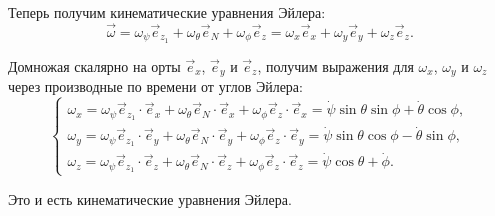 Теперь получим кинематические уравнения Эйлера:
\[
    \vec{\omega} = \omega_\psi\vec{e}_{z_1} + \omega_\theta\vec{e}_N +
    \omega_\phi\vec{e}_z = \omega_x\vec{e}_x + \omega_y\vec{e}_y +
    \omega_z\vec{e}_z.
\]

Домножая скалярно на орты \( \vec{e}_x \), \( \vec{e}_y \) и \( \vec{e}_z \),
получим выражения для \( \omega_x \), \( \omega_y \) и \( \omega_z \) через
производные по времени от углов Эйлера:
\[
    \left\{ \begin{array}{l}
        \omega_x = \omega_\psi\vec{e}_{z_1}\cdot\vec{e}_x +
        \omega_\theta\vec{e}_N\cdot\vec{e}_x +\omega_\phi\vec{e}_z\cdot\vec{e}_x
        = \dot{\psi}\sin\theta\sin\phi + \dot{\theta}\cos\phi, \\
        \omega_y = \omega_\psi\vec{e}_{z_1}\cdot\vec{e}_y +
        \omega_\theta\vec{e}_N\cdot\vec{e}_y +\omega_\phi\vec{e}_z\cdot\vec{e}_y
        = \dot{\psi}\sin\theta\cos\phi - \dot{\theta}\sin\phi, \\
        \omega_z = \omega_\psi\vec{e}_{z_1}\cdot\vec{e}_z +
        \omega_\theta\vec{e}_N\cdot\vec{e}_z +\omega_\phi\vec{e}_z\cdot\vec{e}_z
        = \dot{\psi}\cos\theta + \dot\phi.
    \end{array} \right.
\]

Это и есть кинематические уравнения Эйлера.
\newpage